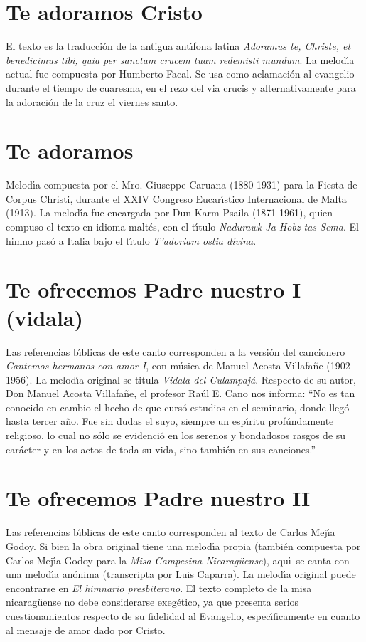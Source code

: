 \documentclass[landscape,12pt]{report}
\begin{document}
\section*{\small Te adoramos Cristo} \noindent\footnotesize El texto es la traducci\'on  de la antigua ant\'\i fona latina \textit{Adoramus te, Christe, et benedicimus tibi, quia per sanctam crucem tuam redemisti mundum}. La melod\'\i a actual fue compuesta por Humberto Facal. Se usa como aclamaci\'on al evangelio durante el tiempo de cuaresma, en el rezo del via crucis y alternativamente para la adoraci\'on de la cruz el viernes santo. 
\section*{\small Te adoramos} \noindent\footnotesize Melod\'\i a compuesta por el Mro. Giuseppe Caruana (1880-1931) para la Fiesta de Corpus Christi, durante el XXIV Congreso Eucar\'\i stico Internacional de Malta (1913).  La melod\'\i a fue encargada por Dun Karm Psaila (1871-1961), quien compuso el texto en idioma malt\'es, con el t\'\i tulo \textit{Nadurawk Ja Hobz tas-Sema}. El himno pas\'o a Italia bajo el t\'\i tulo \textit{T'adoriam ostia divina}.   
\section*{\small Te ofrecemos Padre nuestro I (vidala)} \noindent\footnotesize Las referencias b\'\i blicas de este canto corresponden a la versi\'on del cancionero \textit{Cantemos hermanos con amor I}, con m\'usica de Manuel Acosta Villafa\~ne (1902-1956). La melod\'\i a original se titula \textit{Vidala del Culampaj\'a}. Respecto de su autor, Don Manuel Acosta Villafa\~ne, el profesor Ra\'ul E. Cano nos informa: ``No es tan conocido en cambio el hecho de que curs\'o estudios en el seminario, donde lleg\'o hasta tercer a\~no. Fue sin dudas el suyo, siempre un esp\'\i ritu prof\'undamente religioso, lo cual no s\'olo se evidenci\'o en los serenos y bondadosos rasgos de su car\'acter y en los actos de toda su vida, sino tambi\'en en sus canciones.''
\section*{\small Te ofrecemos Padre nuestro II}  \noindent\footnotesize Las referencias b\'\i blicas de este canto corresponden al texto de Carlos Mej\'\i a Godoy. Si bien la obra original tiene una melod\'\i a propia (tambi\'en compuesta por Carlos Mej\'\i a Godoy para la \textit{Misa Campesina Nicarag\"uense}), aqu\'\i\ se canta con una melod\'\i a  an\'onima (transcripta por Luis Caparra). La melod\'\i a original puede encontrarse en \textit{El himnario presbiterano}. El texto completo de la misa nicarag\"uense no debe considerarse exeg\'etico, ya que presenta serios cuestionamientos respecto de su fidelidad al Evangelio, espec\'\i ficamente en cuanto al mensaje de amor dado por Cristo.
\end{document}
